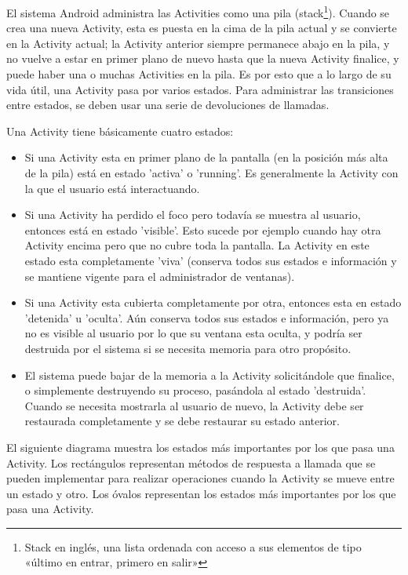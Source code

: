 El sistema Android administra las Activities como una pila (stack\footnote{Stack en inglés, una lista ordenada con acceso a sus elementos de tipo «último en entrar, primero en salir»}). Cuando se crea una nueva Activity, esta es puesta en la cima de la pila actual y se convierte en la Activity actual; la Activity anterior siempre permanece abajo en la pila, y no vuelve a estar en primer plano de nuevo hasta que la nueva Activity finalice, y puede haber una o muchas Activities en la pila.
Es por esto que a lo largo de su vida útil, una Activity pasa por varios estados. Para administrar las transiciones entre estados, se deben usar una serie de devoluciones de llamadas.

Una Activity tiene básicamente cuatro estados:

\begin{itemize}
	\item Si una Activity esta en primer plano de la pantalla (en la posición más alta de la pila) está en estado 'activa' o 'running'. Es generalmente la Activity con la que el usuario está interactuando.
	\item Si una Activity ha perdido el foco pero todavía se muestra al usuario, entonces está en estado 'visible'. Esto sucede por ejemplo cuando hay otra Activity encima pero que no cubre toda la pantalla. La Activity en este estado esta completamente 'viva' (conserva todos sus estados e información y se mantiene vigente para el administrador de ventanas).
	\item Si una Activity esta cubierta completamente por otra, entonces esta en estado 'detenida' u 'oculta'. Aún conserva todos sus estados e información, pero ya no es visible al usuario por lo que su ventana esta oculta, y podría ser destruida por el sistema si se necesita memoria para otro propósito.
	\item El sistema puede bajar de la memoria a la Activity solicitándole que finalice, o simplemente destruyendo su proceso, pasándola al estado 'destruida'. Cuando se necesita mostrarla al usuario de nuevo, la Activity debe ser restaurada completamente y se debe restaurar su estado anterior.
\end{itemize}

El siguiente diagrama muestra los estados más importantes por los que pasa una Activity. Los rectángulos representan métodos de respuesta a llamada que se pueden implementar para realizar operaciones cuando la Activity se mueve entre un estado y otro. Los óvalos representan los estados más importantes por los que pasa una Activity.
\cite{androidDocs}

